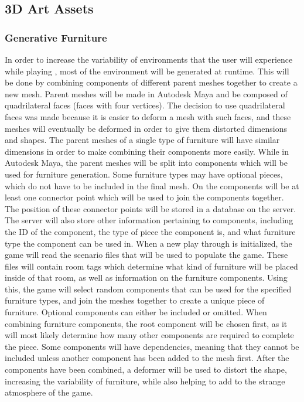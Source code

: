 \clearpage
\subsection{3D Art Assets}

\subsubsection{Generative Furniture}
In order to increase the variability of environments that the user will experience while playing \ourgame, most of the environment will be generated at runtime. This will be done by combining components of different parent meshes together to create a new mesh. Parent meshes will be made in Autodesk Maya and be composed of quadrilateral faces (faces with four vertices). The decision to use quadrilateral faces was made because it is easier to deform a mesh with such faces, and these meshes will eventually be deformed in order to give them distorted dimensions and shapes. The parent meshes of a single type of furniture will have similar dimensions in order to make combining their components more easily. While in Autodesk Maya, the parent meshes will be split into components which will be used for furniture generation. Some furniture types may have optional pieces, which do not have to be included in the final mesh. On the components will be at least one connector point which will be used to join the components together. The position of these connector points will be stored in a database on the server. The server will also store other information pertaining to components, including the ID of the component, the type of piece the component is, and what furniture type the component can be used in. When a new play through is initialized, the game will read the scenario files that will be used to populate the game. These files will contain room tags which determine what kind of furniture will be placed inside of that room, as well as information on the furniture components. Using this, the game will select random components that can be used for the specified furniture types, and join the meshes together to create a unique piece of furniture. Optional components can either be included or omitted. When combining furniture components, the root component will be chosen first, as it will most likely determine how many other components are required to complete the piece. Some components will have dependencies, meaning that they cannot be included unless another component has been added to the mesh first. After the components have been combined, a deformer will be used to distort the shape, increasing the variability of furniture, while also helping to add to the strange atmosphere of the game.

